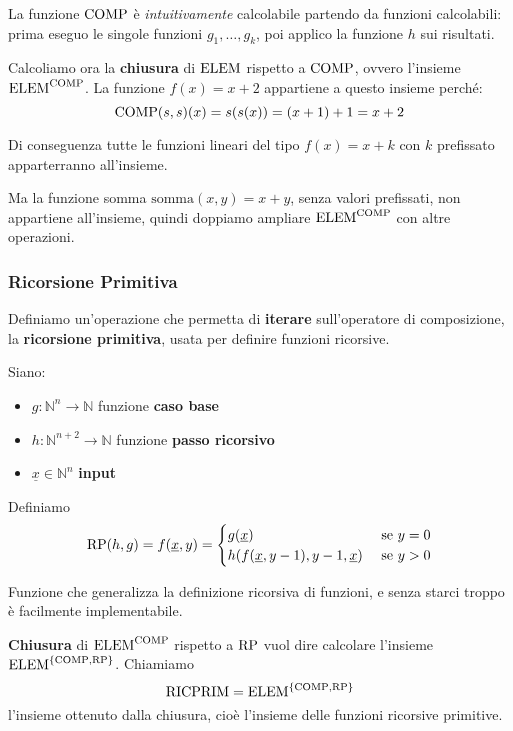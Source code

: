 La funzione $\text{COMP}$ è \textit{intuitivamente} calcolabile partendo da funzioni calcolabili: prima eseguo le singole funzioni $g_1, \dots, g_k$, poi applico la funzione $h$ sui risultati.

Calcoliamo ora la \textbf{chiusura} di $\text{ELEM}$ rispetto a $\text{COMP}$, ovvero l'insieme $\text{ELEM}^{\text{COMP}}$. La funzione $f(x) = x + 2$ appartiene a questo insieme perché:
$$ \text{COMP}(s,s)(x) = s(s(x)) = (x + 1) + 1 = x + 2 $$

Di conseguenza tutte le funzioni lineari del tipo $f(x) = x + k$ con $k$ prefissato apparterranno all'insieme. 

Ma la funzione somma $\text{somma}(x,y) = x+y$, senza valori prefissati, non appartiene all'insieme, quindi doppiamo ampliare $\text{ELEM}^{\text{COMP}}$ con altre operazioni.

\subsubsection{Ricorsione Primitiva}

Definiamo un'operazione che permetta di \textbf{iterare} sull'operatore di composizione, la \textbf{ricorsione primitiva}, usata per definire funzioni ricorsive.

Siano:
\begin{itemize}
	\item $g: \mathbb{N}^n \rightarrow \mathbb{N}$ funzione \textbf{caso base}

	\item $h: \mathbb{N}^{n+2} \rightarrow \mathbb{N}$ funzione \textbf{passo ricorsivo}

	\item $\underline{x} \in \mathbb{N}^n$ \textbf{input}
\end{itemize}

Definiamo
$$
\text{RP} (h,g) = f(\underline{x}, y) = \begin{cases}
	g(\underline{x}) & \text{ se } y = 0 \\
	h(f(\underline{x}, y-1), y-1, \underline{x}) & \text{ se } y > 0 \\
\end{cases}
$$

Funzione che generalizza la definizione ricorsiva di funzioni, e senza starci troppo è facilmente implementabile.

\textbf{Chiusura} di $\text{ELEM}^{\text{COMP}}$ rispetto a $\text{RP}$ vuol dire calcolare l'insieme $\text{ELEM}^{\{\text{COMP}, \text{RP}\}}$. Chiamiamo
$$ \text{RICPRIM} = \text{ELEM}^{\{\text{COMP}, \text{RP}\}} $$
l'insieme ottenuto dalla chiusura, cioè l'insieme delle funzioni ricorsive primitive.

